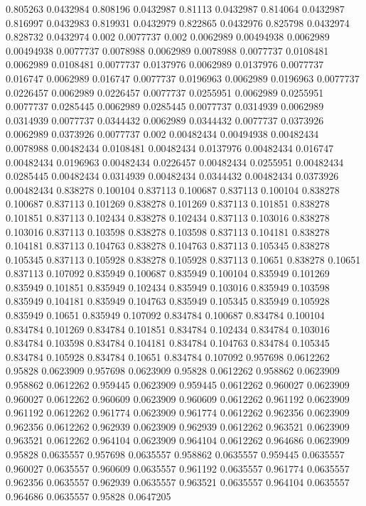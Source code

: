 0.805263 0.0432984
0.808196 0.0432987
0.81113 0.0432987
0.814064 0.0432987
0.816997 0.0432983
0.819931 0.0432979
0.822865 0.0432976
0.825798 0.0432974
0.828732 0.0432974
0.002 0.0077737
0.002 0.0062989
0.00494938 0.0062989
0.00494938 0.0077737
0.0078988 0.0062989
0.0078988 0.0077737
0.0108481 0.0062989
0.0108481 0.0077737
0.0137976 0.0062989
0.0137976 0.0077737
0.016747 0.0062989
0.016747 0.0077737
0.0196963 0.0062989
0.0196963 0.0077737
0.0226457 0.0062989
0.0226457 0.0077737
0.0255951 0.0062989
0.0255951 0.0077737
0.0285445 0.0062989
0.0285445 0.0077737
0.0314939 0.0062989
0.0314939 0.0077737
0.0344432 0.0062989
0.0344432 0.0077737
0.0373926 0.0062989
0.0373926 0.0077737
0.002 0.00482434
0.00494938 0.00482434
0.0078988 0.00482434
0.0108481 0.00482434
0.0137976 0.00482434
0.016747 0.00482434
0.0196963 0.00482434
0.0226457 0.00482434
0.0255951 0.00482434
0.0285445 0.00482434
0.0314939 0.00482434
0.0344432 0.00482434
0.0373926 0.00482434
0.838278 0.100104
0.837113 0.100687
0.837113 0.100104
0.838278 0.100687
0.837113 0.101269
0.838278 0.101269
0.837113 0.101851
0.838278 0.101851
0.837113 0.102434
0.838278 0.102434
0.837113 0.103016
0.838278 0.103016
0.837113 0.103598
0.838278 0.103598
0.837113 0.104181
0.838278 0.104181
0.837113 0.104763
0.838278 0.104763
0.837113 0.105345
0.838278 0.105345
0.837113 0.105928
0.838278 0.105928
0.837113 0.10651
0.838278 0.10651
0.837113 0.107092
0.835949 0.100687
0.835949 0.100104
0.835949 0.101269
0.835949 0.101851
0.835949 0.102434
0.835949 0.103016
0.835949 0.103598
0.835949 0.104181
0.835949 0.104763
0.835949 0.105345
0.835949 0.105928
0.835949 0.10651
0.835949 0.107092
0.834784 0.100687
0.834784 0.100104
0.834784 0.101269
0.834784 0.101851
0.834784 0.102434
0.834784 0.103016
0.834784 0.103598
0.834784 0.104181
0.834784 0.104763
0.834784 0.105345
0.834784 0.105928
0.834784 0.10651
0.834784 0.107092
0.957698 0.0612262
0.95828 0.0623909
0.957698 0.0623909
0.95828 0.0612262
0.958862 0.0623909
0.958862 0.0612262
0.959445 0.0623909
0.959445 0.0612262
0.960027 0.0623909
0.960027 0.0612262
0.960609 0.0623909
0.960609 0.0612262
0.961192 0.0623909
0.961192 0.0612262
0.961774 0.0623909
0.961774 0.0612262
0.962356 0.0623909
0.962356 0.0612262
0.962939 0.0623909
0.962939 0.0612262
0.963521 0.0623909
0.963521 0.0612262
0.964104 0.0623909
0.964104 0.0612262
0.964686 0.0623909
0.95828 0.0635557
0.957698 0.0635557
0.958862 0.0635557
0.959445 0.0635557
0.960027 0.0635557
0.960609 0.0635557
0.961192 0.0635557
0.961774 0.0635557
0.962356 0.0635557
0.962939 0.0635557
0.963521 0.0635557
0.964104 0.0635557
0.964686 0.0635557
0.95828 0.0647205
